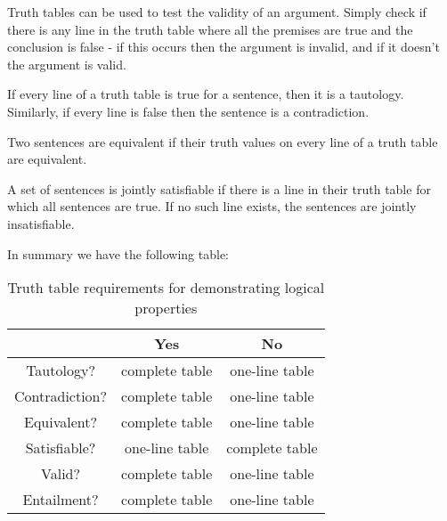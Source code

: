 \begin{remark}
    Truth tables can be used to test the validity of an argument. Simply check if there is any line in the truth table where all the premises are true and the conclusion is false - if this occurs then the argument is invalid, and if it doesn't the argument is valid.
\end{remark}

\begin{remark}
    If every line of a truth table is true for a sentence, then it is a tautology. Similarly, if every line is false then the sentence is a contradiction.
\end{remark}

\begin{remark}
    Two sentences are equivalent if their truth values on every line of a truth table are equivalent.
\end{remark}


\begin{remark}
    A set of sentences is jointly satisfiable if there is a line in their truth table for which all sentences are true. If no such line exists, the sentences are jointly insatisfiable.
\end{remark}

In summary we have the following table:

\begin{table}[H]
    \centering
    \caption{Truth table requirements for demonstrating logical properties}
    \begin{tabular}{c|cc}
        & \textbf{Yes} & \textbf{No} \\ \hline
        Tautology? & complete table & one-line table \\
        Contradiction? & complete table & one-line table \\
        Equivalent? & complete table & one-line table \\
        Satisfiable? & one-line table & complete table \\
        Valid? & complete table & one-line table \\
        Entailment? & complete table & one-line table
    \end{tabular}
\end{table}


